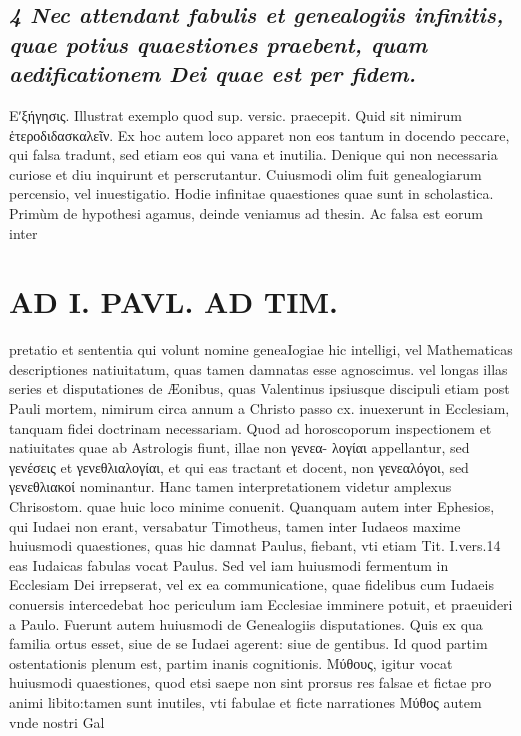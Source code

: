 \documentclass{article}
\begin{document}
\begin{pages}
\subsection*{\textit{4 Nec attendant fabulis et genealogiis infinitis, quae potius quaestiones praebent, quam aedificationem Dei quae est per fidem. }}\pstart Εʹξήγησις. Illustrat exemplo quod sup. versic. praecepit. Quid sit nimirum ἑτεροδιδασκαλεῖν. Ex hoc autem loco apparet non eos tantum in docendo peccare, qui falsa tradunt, sed etiam eos qui vana et inutilia. Denique qui non necessaria curiose et diu inquirunt et perscrutantur. Cuiusmodi olim fuit genealogiarum percensio, vel inuestigatio. Hodie infinitae quaestiones quae sunt in scholastica. Primùm de hypothesi agamus, deinde veniamus ad thesin. Ac falsa est eorum inter\pend
\section*{AD I. PAVL. AD TIM. }
\marginpar{[ p.1O ]}\pstart pretatio et sententia qui volunt nomine geneaIogiae hic intelligi, vel Mathematicas descriptiones natiuitatum, quas tamen damnatas esse agnoscimus. vel longas illas series et disputationes de Æonibus, quas Valentinus ipsiusque discipuli etiam post Pauli mortem, nimirum circa annum a Christo passo cx. inuexerunt in Ecclesiam, tanquam fidei doctrinam necessariam.  \pend\pstart Quod ad horoscoporum inspectionem et natiuitates quae ab Astrologis fiunt, illae non γενεα- λογίαι appellantur, sed γενέσεις et γενεθλιαλογίαι, et qui eas tractant et docent, non γενεαλόγοι, sed γενεθλιακοί nominantur. Hanc tamen interpretationem videtur amplexus Chrisostom. quae huic loco minime conuenit.  \pend\pstart Quanquam autem inter Ephesios, qui Iudaei non erant, versabatur Timotheus, tamen inter Iudaeos maxime huiusmodi quaestiones, quas hic damnat Paulus, fiebant, vti etiam Tit. I.vers.14 eas Iudaicas fabulas vocat Paulus. Sed vel iam huiusmodi fermentum in Ecclesiam Dei irrepserat, vel ex ea communicatione, quae fidelibus cum Iudaeis conuersis intercedebat hoc periculum iam Ecclesiae imminere potuit, et praeuideri a Paulo.  \pend\pstart Fuerunt autem huiusmodi de Genealogiis disputationes. Quis ex qua familia ortus esset, siue de se Iudaei agerent: siue de gentibus. Id quod partim ostentationis plenum est, partim inanis cognitionis.  \pend\pstart Μύθους, igitur vocat huiusmodi quaestiones, quod etsi saepe non sint prorsus res falsae et fictae pro animi libito:tamen sunt inutiles, vti fabulae et ficte narrationes Μύθος autem vnde nostri Gal\pend

\end{pages}
\end{document}

